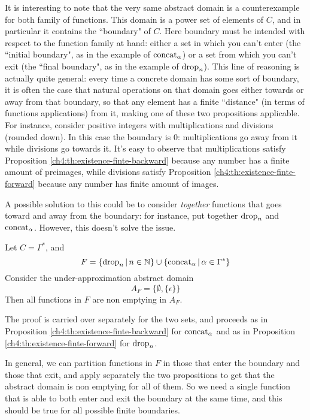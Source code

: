 It is interesting to note that the very same abstract domain is a counterexample for both family of functions. This domain is a power set of elements of $C$, and in particular it contains the ``boundary" of $C$. Here boundary must be intended with respect to the function family at hand: either a set in which you can't enter (the ``initial boundary", as in the example of $\text{concat}_{\alpha}$) or a set from which you can't exit (the ``final boundary", as in the example of $\text{drop}_n$).
This line of reasoning is actually quite general: every time a concrete domain has some sort of boundary, it is often the case that natural operations on that domain goes either towards or away from that boundary, so that any element has a finite ``distance" (in terms of functions applications) from it, making one of these two propositions applicable.
For instance, consider positive integers with multiplications and divisions (rounded down). In this case the boundary is $0$: multiplications go away from it while divisions go towards it. It's easy to observe that multiplications satisfy Proposition \ref{ch4:th:existence-finte-backward} because any number has a finite amount of preimages, while divisions satisfy Proposition \ref{ch4:th:existence-finte-forward} because any number has finite amount of images.

A possible solution to this could be to consider \textit{together} functions that goes toward and away from the boundary: for instance, put together $\text{drop}_n$ and $\text{concat}_{\alpha}$. However, this doesn't solve the issue.
\begin{example}
	Let $C = \Gamma^*$, and
	\[
	F = \{ \text{drop}_n \,\vert\, n \in \mathbb{N} \} \cup \{ \text{concat}_{\alpha} \,\vert\, \alpha \in \Gamma^* \}
	\]
	Consider the under-approximation abstract domain
	\[
	A_F = \{ \emptyset, \{ \epsilon \} \}
	\]
	Then all functions in $F$ are non emptying in $A_F$.

	The proof is carried over separately for the two sets, and proceeds as in Proposition \ref{ch4:th:existence-finte-backward} for $\text{concat}_{\alpha}$ and as in Proposition \ref{ch4:th:existence-finte-forward} for $\text{drop}_n$.
\end{example}
In general, we can partition functions in $F$ in those that enter the boundary and those that exit, and apply separately the two propositions to get that the abstract domain is non emptying for all of them. So we need a single function that is able to both enter and exit the boundary at the same time, and this should be true for all possible finite boundaries.

